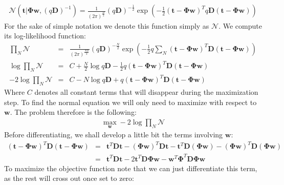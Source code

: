 \documentclass[a4paper, 11pt]{article}
\begin{document}
\begin{eqnarray}
\mathcal{N} \left( \mathbf{t} | \mathbf{\Phi} \mathbf{w}, (q \mathbf{D})^{-1} \right) = \frac{1}{(2 \pi)^{\frac{D}{2}}} (q \mathbf{D})^{-\frac{1}{2}} \exp \left( -\frac{1}{2} (\mathbf{t} - \mathbf{\Phi} \mathbf{w} )^{T} q \mathbf{D} (\mathbf{t} - \mathbf{\Phi} \mathbf{w} ) \right) \nonumber
\end{eqnarray}
For the sake of simple notation we denote this function simply as $\mathcal{N}$. We compute its log-likelihood function:
\begin{eqnarray}
\prod_N \mathcal{N} &=& \frac{1}{(2 \pi)^{\frac{ND}{2}}} (q \mathbf{D})^{-\frac{N}{2}} \exp \left( -\frac{1}{2} q \sum_N (\mathbf{t} - \mathbf{\Phi} \mathbf{w} )^{T} \mathbf{D} (\mathbf{t} - \mathbf{\Phi} \mathbf{w} ) \right) \nonumber \\
\log \prod_N \mathcal{N} &=& C + \frac{N}{2} \log q \mathbf{D} -\frac{1}{2} q (\mathbf{t} - \mathbf{\Phi} \mathbf{w} )^{T} \mathbf{D} (\mathbf{t} - \mathbf{\Phi} \mathbf{w} ) \nonumber \\
-2 \log \prod_N \mathcal{N} &=& C - N \log q \mathbf{D} + q (\mathbf{t} - \mathbf{\Phi} \mathbf{w} )^{T} \mathbf{D} (\mathbf{t} - \mathbf{\Phi} \mathbf{w} ) \nonumber 
\end{eqnarray}
Where $C$ denotes all constant terms that will disappear during the maximization step. To find the normal equation we will only need to maximize with respect to $\mathbf{w}$. The problem therefore is the following:
\begin{eqnarray}
\max_{\mathbf{w}} -2 \log \prod_N \mathcal{N}  \nonumber
\end{eqnarray}
Before differentiating, we shall develop a little bit the terms involving $\mathbf{w}$:
\begin{eqnarray}
(\mathbf{t} - \mathbf{\Phi} \mathbf{w} )^{T} \mathbf{D} (\mathbf{t} - \mathbf{\Phi} \mathbf{w} ) &=& \mathbf{t}^T \mathbf{D} \mathbf{t} - \left( \mathbf{\Phi} \mathbf{w} \right)^{T} \mathbf{D} \mathbf{t} - \mathbf{t}^T \mathbf{D} \left( \mathbf{\Phi} \mathbf{w} \right) - \left( \mathbf{\Phi} \mathbf{w} \right)^T \mathbf{D} \left( \mathbf{\Phi} \mathbf{w} \right) \nonumber \\
&=& \mathbf{t}^T \mathbf{D} \mathbf{t} - 2 \mathbf{t}^T \mathbf{D} \mathbf{\Phi} \mathbf{w} - \mathbf{w}^T \mathbf{\Phi}^T \mathbf{D} \mathbf{\Phi} \mathbf{w} \nonumber
\end{eqnarray}
To maximize the objective function note that we can just differentiate this term, as the rest will cross out once set to zero:
\end{document}
